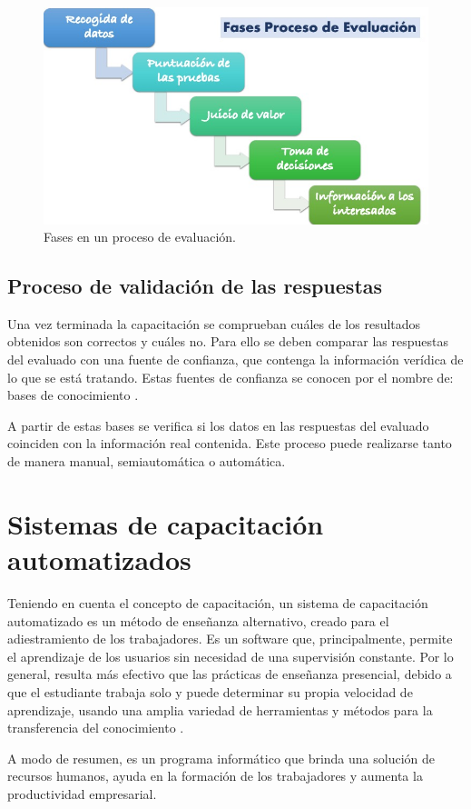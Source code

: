 \begin{figure}[h]
\centering
 \includegraphics[width=0.6\linewidth]{imagen/fases-proceso-evaluacion.jpg}
 \caption{Fases en un proceso de evaluación.}
 \label{fig:fases-evaluacion} 
\end{figure}

\subsection{Proceso de validación de las respuestas}
Una vez terminada la capacitación se comprueban cuáles de los resultados obtenidos son correctos y cuáles no. Para ello se deben comparar las respuestas del evaluado con una fuente de confianza, que contenga la información verídica de lo que se está tratando. Estas fuentes de confianza se conocen por el nombre de: bases de conocimiento \cite{Rasheed2021}.

A partir de estas bases se verifica si los datos en las respuestas del evaluado coinciden con la información real contenida. Este proceso puede realizarse tanto de manera manual, semiautomática o automática.


\section{Sistemas de capacitación automatizados}
Teniendo en cuenta el concepto de capacitación, un sistema de capacitación automatizado es un método de enseñanza alternativo, creado para el adiestramiento de los trabajadores. Es un software que, principalmente, permite el aprendizaje de los usuarios sin necesidad de una supervisión constante. Por lo general, resulta más efectivo que las prácticas de enseñanza presencial, debido a que el estudiante trabaja solo y puede determinar su propia velocidad de aprendizaje, usando una amplia variedad de herramientas y métodos para la transferencia del conocimiento \cite{ISEM2022}.

A modo de resumen, es un programa informático que brinda una solución de recursos humanos, ayuda en la formación de los trabajadores y aumenta la productividad empresarial.

